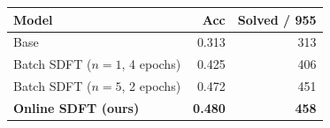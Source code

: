 \begin{tabular}{lrr}
\toprule
Model & Acc & Solved / 955 \\
\midrule
Base & 0.313 & 313 \\
Batch SDFT ($n{=}1$, 4 epochs) & 0.425 & 406 \\
Batch SDFT ($n{=}5$, 2 epochs) & 0.472 & 451 \\
\textbf{Online SDFT (ours)} & \textbf{0.480} & \textbf{458} \\
\bottomrule
\end{tabular}
